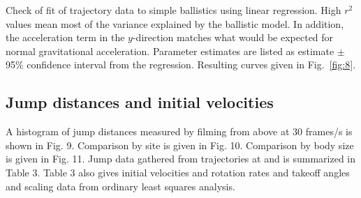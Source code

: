 \documentclass{jeb}
\newcommand{\Hyale}{\Genus{H.~pugettensis}}
\begin{document}
%



\begin{table}
\caption{ Check of fit of trajectory data to simple ballistics using linear regression.  High $r^2$ values mean most of the variance explained by the ballistic model.  In addition, the acceleration term in the $y$-direction matches what would be expected for normal gravitational acceleration.  Parameter estimates are listed as estimate $\pm$ 95\% confidence interval from the regression.  Resulting curves given in Fig.~\ref{fig:8}.}
\label{table:2}
\end{table}

\subsection{Jump distances and initial velocities}
	A histogram of jump distances measured by filming from above at 30 frames/s is shown in Fig. 9.  Comparison by site is given in Fig. 10.  Comparison by body size is given in Fig. 11.  Jump data gathered from trajectories at  and  is summarized in Table 3.  Table 3 also gives initial velocities and rotation rates and takeoff angles and scaling data from ordinary least squares analysis. 
\end{document}
